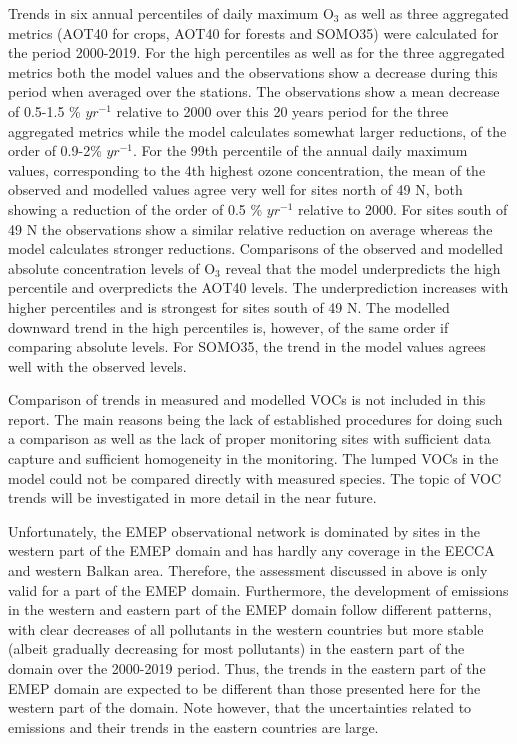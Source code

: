 Trends in six annual percentiles of daily maximum O$_3$ as well as three aggregated metrics (AOT40 for crops, AOT40 for forests and SOMO35) were calculated for the period 2000-2019. For the high percentiles as well as for the three aggregated metrics both the model values and the observations show a decrease during this period when averaged over the stations. The observations show a mean decrease of 0.5-1.5 \% $yr^{-1}$ relative to 2000 over this 20 years period for the three aggregated metrics while the model calculates somewhat larger reductions, of the order of 0.9-2\% $yr^{-1}$. For the 99th percentile of the annual daily maximum values, corresponding to the 4th highest ozone concentration, the mean of the observed and modelled values agree very well for sites north of 49 \degrees N, both showing a reduction of the order of 0.5  \% $yr^{-1}$ relative to 2000. For sites south of 49 \degrees N the observations show a similar relative reduction on average whereas the model calculates stronger reductions. Comparisons of the observed and modelled absolute concentration levels of O$_3$ reveal that the model underpredicts the high percentile and overpredicts the AOT40 levels. The underprediction increases with higher percentiles and is strongest for sites south of 49 \degrees N. The modelled downward trend in the high percentiles is, however, of the same order if comparing absolute levels. For SOMO35, the trend in the model values agrees well with the observed levels.

Comparison of trends in measured and modelled VOCs is not included in this report. The main reasons being the lack of established procedures for doing such a comparison as well as the lack of proper monitoring sites with sufficient data capture and sufficient homogeneity in the monitoring. The lumped VOCs in the model could not be compared directly with measured species. The topic of VOC trends will be investigated in more detail in the near future.  





Unfortunately, the EMEP observational network is dominated by sites in the western part of the EMEP domain and has hardly any coverage in the EECCA and western Balkan area. Therefore, the assessment discussed in above is only valid for a part of the EMEP domain. Furthermore, the development of emissions in the western and eastern part of the EMEP domain follow different patterns, with clear decreases of all pollutants in the western countries  but more stable (albeit gradually decreasing for most pollutants) in the eastern part of the domain over the 2000-2019 period. Thus, the trends in the eastern part of the EMEP domain are expected to be different than those presented here for the western part of the domain. Note however, that the uncertainties related to emissions and their trends in the eastern countries are large.










